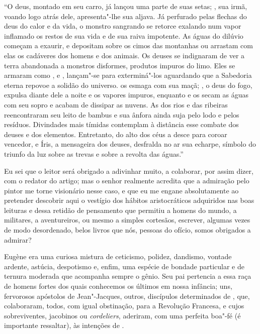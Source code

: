“O deus, montado em seu carro, já lançou uma parte de suas setas; ,
sua irmã, voando logo atrás dele, apresenta"-lhe sua aljava. Já
perfurado pelas flechas do deus do calor e da vida, o monstro sangrando
se retorce exalando num vapor inflamado os restos de sua vida e de sua
raiva impotente. As águas do dilúvio começam a exaurir, e depositam
sobre os cimos das montanhas ou arrastam com elas os cadáveres dos
homens e dos animais. Os deuses se indignaram de ver a terra abandonada
a monstros disformes, produtos impuros do limo. Eles se armaram como
,  e , lançam"-se para exterminá"-los aguardando que a
Sabedoria eterna repovoe a solidão do universo.  os esmaga com
sua maçã; , o deus do fogo, expulsa diante dele a noite e os
vapores impuros, enquanto  e os  secam as águas com seu
sopro e acabam de dissipar as nuvens. As  dos rios e das ribeiras
reencontraram seu leito de bambus e sua ânfora ainda suja pelo lodo e
pelos resíduos. Divindades mais tímidas contemplam à distância esse
combate dos deuses e dos elementos. Entretanto, do alto dos céus a
 desce para coroar  vencedor, e Íris, a mensageira dos
deuses, desfralda no ar sua echarpe, símbolo do triunfo da luz sobre as
trevas e sobre a revolta das águas.”

Eu sei que o leitor será obrigado a adivinhar muito, a colaborar, por
assim dizer, com o redator do artigo; mas o senhor realmente acredita
que a admiração pelo pintor me torne visionário nesse caso, e que eu me
engane absolutamente ao pretender descobrir aqui o vestígio dos hábitos
aristocráticos adquiridos nas boas leituras e dessa retidão de
pensamento que permitiu a homens do mundo, a militares, a aventureiros,
ou mesmo a simples cortesãos, escrever, algumas vezes de modo
desordenado, belos livros que nós, pessoas do ofício, somos obrigados a
admirar?

\sectionitem

Eugène  era uma curiosa mistura de ceticismo, polidez,
dandismo, vontade ardente, astúcia, despotismo e, enfim, uma espécie de
bondade particular e de ternura moderada que acompanha sempre o gênio.
Seu pai pertencia a essa raça de homens fortes dos quais conhecemos os
últimos em nossa infância; uns, fervorosos apóstolos de  Jean"-Jacques,
outros, discípulos determinados de , que, colaboraram, todos,
com igual obstinação, para a Revolução Francesa, e cujos sobreviventes,
jacobinos ou \textit{cordeliers}, aderiram, com uma perfeita boa"-fé (é
importante ressaltar), às intenções de .


